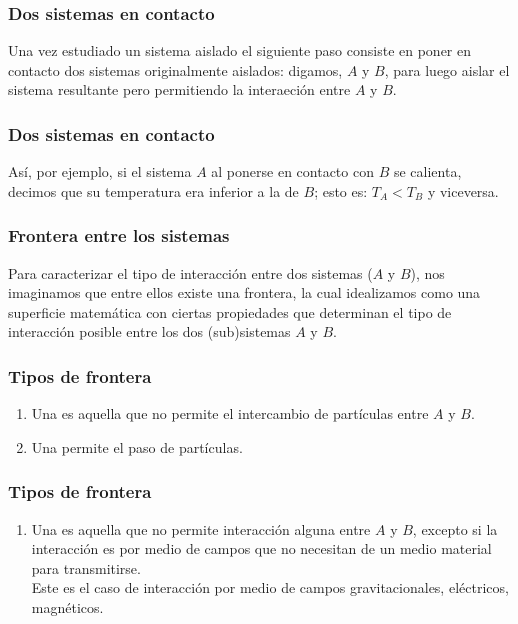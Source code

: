 \documentclass[12pt]{beamer}
\begin{document}
\begin{frame}
\frametitle{Dos sistemas en contacto}
Una vez estudiado un sistema aislado el siguiente paso consiste en poner en contacto dos sistemas originalmente aislados: digamos, $A$ y $B$, \pause para luego aislar el sistema resultante pero permitiendo la interaeción entre $A$ y $B$.
\end{frame}
\begin{frame}
\frametitle{Dos sistemas en contacto}
Así, por ejemplo, si el sistema $A$ al ponerse en contacto con $B$ se calienta, decimos que su temperatura era inferior a la de $B$; \pause esto es: $T_{A} < T_{B}$ y viceversa.
\end{frame}
\begin{frame}
\frametitle{Frontera entre los sistemas}
Para caracterizar el tipo de interacción entre dos sistemas  ($A$ y $B$), \pause nos imaginamos que entre ellos existe una frontera, \pause la cual idealizamos como una superficie matemática con ciertas propiedades que determinan el tipo de interacción posible entre los dos (sub)sistemas $A$ y $B$.
\end{frame}
\begin{frame}
\frametitle{Tipos de frontera}
\begin{enumerate}[<+->]
\item Una  es aquella que no permite el intercambio de partículas entre $A$ y $B$.
\item Una  permite el paso de partículas.
\seti
\end{enumerate}
\end{frame}
\begin{frame}
\frametitle{Tipos de frontera}
\begin{enumerate}[<+->]
\conti
\item Una  es aquella que no permite interacción alguna entre $A$ y $B$, excepto si la interacción es por medio de campos que no necesitan de un medio material para transmitirse.
\\[0.5em] \pause
Este es el caso de interacción por medio de campos gravitacionales, eléctricos, magnéticos.
\seti
\end{enumerate}
\end{frame}
\end{document}
